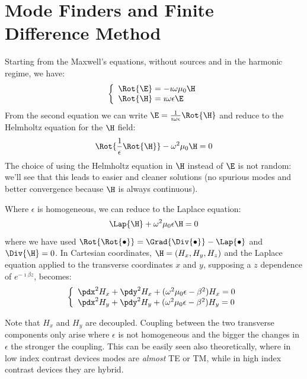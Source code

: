 \chapter{Mode Finders and Finite Difference Method}

Starting from the Maxwell's equations, without sources and in the
harmonic regime, we have:
\begin{equation}
  \left\{
  \begin{array}{ll}
    \Rot{\E} = -\imath \omega \mu_0 \H \\
    \Rot{\H} = \imath \omega \epsilon \E
  \end{array}
  \right.
\end{equation}
From the second equation we can write $\E = \frac{1}{\imath
\omega \epsilon} \Rot{\H}$ and reduce to the Helmholtz
equation for the $\H$ field:
\begin{equation} \label{eqn:helmholtz_h}
  \Rot{\frac{1}{\epsilon} \Rot{\H}} - \omega^2 \mu_0
  \H = 0
\end{equation}
The choice of using the Helmholtz equation in $\H$ instead of
$\E$ is not random: we'll see that this leads to easier and
cleaner solutions (no spurious modes and better convergence because
$\H$ is always continuous).

Where $\epsilon$ is homogeneous, we can reduce to the Laplace
equation:
\begin{equation} \label{eqn:helmholtz_decoupled}
  \Lap{\H} + \omega^2 \mu_0 \epsilon \H = 0
\end{equation}
where we have used $\Rot{\Rot{\bullet}} = \Grad{\Div{\bullet}} -
\Lap{\bullet}$ and $\Div{\H} = 0$. In Cartesian coordinates, $\H =
(H_x,H_y,H_z)$ and the Laplace equation applied to the transverse
coordinates $x$ and $y$, supposing a $z$ dependence of $e^{-\imath
  \beta z}$, becomes:
\begin{equation} \label{eqn:helmholtz_decoupled_cartesian}
  \left\{
  \begin{array}{ll}
    \pdx^2 H_x + \pdy^2 H_x + (\omega^2 \mu_0 \epsilon - \beta^2) H_x = 0 \\
    \pdx^2 H_y + \pdy^2 H_y + (\omega^2 \mu_0 \epsilon - \beta^2) H_y = 0
  \end{array}
  \right.
\end{equation}

Note that $H_x$ and $H_y$ are decoupled. Coupling between the two
transverse components only arise where $\epsilon$ is not homogeneous
and the bigger the changes in $\epsilon$ the stronger the
coupling. This can be easily seen also theoretically, where in low
index contrast devices modes are \emph{almost} TE or TM, while in high
index contrast devices they are hybrid.

